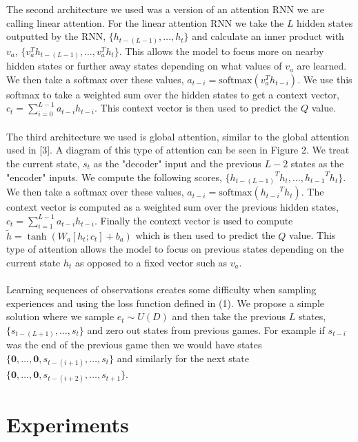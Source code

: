 \documentclass{article}
\begin{document}
The second architecture we used was a version of an attention RNN we are calling
linear attention. For the linear attention RNN we take the $L$ hidden states
outputted by the RNN, $\{h_{t-(L-1)}, \dots, h_{t}\}$ and calculate an inner
product with $v_a$, $\{v_a^Th_{t-(L-1)}, \dots, v_a^Th_{t}\}$. This allows the
model to focus more on nearby hidden states or further away states depending on
what values of $v_a$ are learned. We then take a softmax over these values,
$a_{t-i} = \text{softmax}(v_a^Th_{t-i})$. We use this softmax to take a weighted
sum over the hidden states to get a context vector,
$c_t = \sum_{i=0}^{L-1}a_{t-i}h_{t-i}$. This context vector is then used to predict
the $Q$ value. \\
\\
The third architecture we used is global attention, similar to the global attention
used in [3]. A diagram of this type of attention can be seen in Figure 2. We treat
the current state, $s_t$ as the "decoder" input and the previous $L - 2$ states as
the "encoder" inputs. We compute the following scores,
$\{{h_{t-(L-1)}}^Th_t, \dots, {h_{t-1}}^Th_t\}$. We then take a softmax over these
values, $a_{t-i} = \text{softmax}({h_{t-i}}^Th_t)$. The context vector is computed
as a weighted sum over the previous hidden states, $c_t = \sum_{i=1}^{L-1}a_{t-i}h_{t-i}$.
Finally the context vector is used to compute $\tilde{h} = \tanh(W_a[h_t;c_t] + b_a)$
which is then used to predict the $Q$ value. This type of attention allows the model
to focus on previous states depending on the current state $h_t$ as opposed to a
fixed vector such as $v_a$. \\
\\
Learning sequences of observations creates some difficulty when sampling
experiences and using the loss function defined in (1). We propose a simple
solution where we sample $e_t \sim U(D)$ and then take the previous $L$ states,
$\{s_{t-(L+1)}, \dots, s_t\}$ and zero out states from previous games. For example
if $s_{t-i}$ was the end of the previous game then we would have states
$\{\mathbf{0}, \dots, \mathbf{0}, s_{t-(i+1)}, \dots, s_t\}$ and similarly for the
next state $\{\mathbf{0}, \dots, \mathbf{0},s_{t-(i+2)}, \dots, s_{t+1}\}$.

\section{Experiments}
\end{document}
